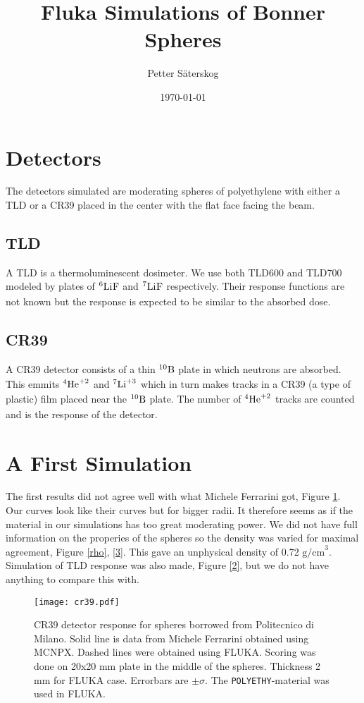 \documentclass[a4paper,10pt]{article}
\title{Fluka Simulations of Bonner Spheres}
\author{Petter S\"{a}terskog}
\date{\today}
\newcommand{\nucl}[3]{
\ensuremath{
\phantom{\ensuremath{^{#1}_{#2}}}
\llap{\ensuremath{^{#1}}}
\llap{\ensuremath{_{\rule{0pt}{.75em}#2}}}
\mbox{#3}
}
}
\begin{document}
\maketitle
\section{Detectors}
The detectors simulated are moderating spheres of polyethylene with either a TLD or a CR39 placed in the center with the flat face facing the beam.
\subsection{TLD}
A TLD is a thermoluminescent dosimeter. We use both TLD600 and TLD700 modeled by plates of $\nucl{6}{}{Li}\nucl{}{}{F}$ and $\nucl{7}{}{Li}\nucl{}{}{F}$ respectively. Their response functions are not known but the response is expected to be similar to the absorbed dose.
\subsection{CR39}
A CR39 detector consists of a thin $\nucl{10}{}{B}$ plate in which neutrons are absorbed. This emmits $\nucl{4}{}{He}^{+2}$ and $\nucl{7}{}{Li}^{+3}$ which in turn makes tracks in a CR39 (a type of plastic) film placed near the $\nucl{10}{}{B}$ plate. The number of $\nucl{4}{}{He}^{+2}$ tracks are counted and is the response of the detector.
\section{A First Simulation}
The first results did not agree well with what Michele Ferrarini got, Figure \ref{1}. Our curves look like their curves but for bigger radii. It therefore seems as if the material in our simulations has too great moderating power. We did not have full information on the properies of the spheres so the density was varied for maximal agreement, Figure \ref{rho}, \ref{3}. This gave an unphysical density of 0.72 $\mathrm{g/cm}^3$.\\ Simulation of TLD response was also made, Figure \ref{2}, but we do not have anything to compare this with.
\begin{figure}
\centering
\texttt{[image: cr39.pdf]}
\caption
{CR39 detector response for spheres borrowed from Politecnico di Milano. Solid line is data from Michele Ferrarini obtained using MCNPX. Dashed lines were obtained using FLUKA. Scoring was done on 20x20 mm plate in the middle of the spheres. Thickness 2 mm for FLUKA case. Errorbars are $\pm\sigma$. The \texttt{POLYETHY}-material was used in FLUKA.}\label{1}
\end{figure}
\end{document}
